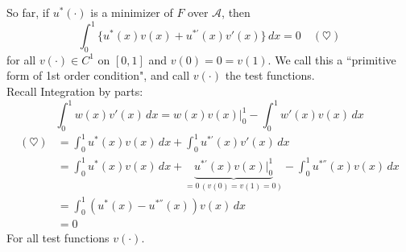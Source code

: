 \documentclass[11pt]{article}
\newcommand{\mc}[1]{\mathcal{#1}}
\begin{document}
So far, if $u^*(\cdot)$ is a minimizer of $F$ over $\mc{A}$, then
$$\int_0^1 \{u^*(x)v(x) + u^{*'}(x)v'(x)\} \, dx = 0 \quad (\heartsuit)$$
for all $v(\cdot) \in C^1$ on $[0,1]$ and $v(0) = 0 = v(1)$.
We call this a ``primitive form of 1st order condition", and call $v(\cdot)$ the test functions. \\
Recall Integration by parts:
$$\int_0^1 w(x)v'(x) \, dx = w(x)v(x)|_0^1 - \int_0^1 w'(x)v(x) \, dx$$
\begin{align}
	(\heartsuit) &= \int_0^1 u^*(x) v(x) \, dx + \int_0^1 u^{*'}(x) v'(x) \, dx \\
	&=  \int_0^1 u^*(x) v(x) \, dx + \underbrace{u^{*'}(x)v(x)|_0^1}_{=0 \, (v(0) = v(1) = 0)} - \int_0^1 u^{*''}(x)v(x) \, dx \\
	&= \int_0^1 \left(u^*(x) - u^{*''}(x)\right) v(x) \, dx \\
	&= 0
\end{align}
For all test functions $v(\cdot)$.\\
\end{document}
